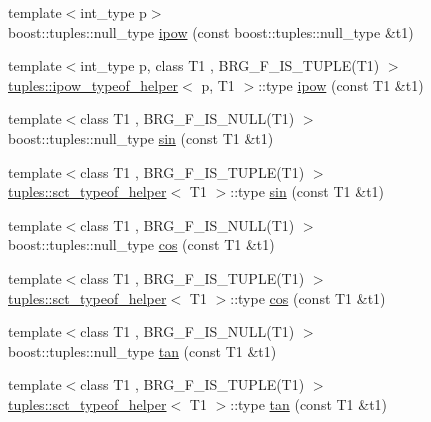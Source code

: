 \begin{DoxyCompactItemize}
\item 
{\footnotesize template$<$int\+\_\+type p$>$ }\\boost\+::tuples\+::null\+\_\+type \hyperlink{namespaceIceBRG_ae7f18ccc5167613b85197709db7a0622}{ipow} (const boost\+::tuples\+::null\+\_\+type \&t1)
\item 
{\footnotesize template$<$int\+\_\+type p, class T1 , B\+R\+G\+\_\+\+F\+\_\+\+I\+S\+\_\+\+T\+U\+P\+L\+E(\+T1) $>$ }\\\hyperlink{namespaceIceBRG_1_1tuples_structIceBRG_1_1tuples_1_1ipow__typeof__helper}{tuples\+::ipow\+\_\+typeof\+\_\+helper}$<$ p, T1 $>$\+::type \hyperlink{namespaceIceBRG_a32105d97f288cf7ddc6359c296ad616b}{ipow} (const T1 \&t1)
\item 
{\footnotesize template$<$class T1 , B\+R\+G\+\_\+\+F\+\_\+\+I\+S\+\_\+\+N\+U\+L\+L(\+T1) $>$ }\\boost\+::tuples\+::null\+\_\+type \hyperlink{namespaceIceBRG_a7d2b97ebbeb202a1ca4f445bda7390b3}{sin} (const T1 \&t1)
\item 
{\footnotesize template$<$class T1 , B\+R\+G\+\_\+\+F\+\_\+\+I\+S\+\_\+\+T\+U\+P\+L\+E(\+T1) $>$ }\\\hyperlink{namespaceIceBRG_1_1tuples_structIceBRG_1_1tuples_1_1sct__typeof__helper}{tuples\+::sct\+\_\+typeof\+\_\+helper}$<$ T1 $>$\+::type \hyperlink{namespaceIceBRG_a57632b44d01f63ff4a21726aee92500f}{sin} (const T1 \&t1)
\item 
{\footnotesize template$<$class T1 , B\+R\+G\+\_\+\+F\+\_\+\+I\+S\+\_\+\+N\+U\+L\+L(\+T1) $>$ }\\boost\+::tuples\+::null\+\_\+type \hyperlink{namespaceIceBRG_a0c9d048c22cc1bb0e0f593417819bab8}{cos} (const T1 \&t1)
\item 
{\footnotesize template$<$class T1 , B\+R\+G\+\_\+\+F\+\_\+\+I\+S\+\_\+\+T\+U\+P\+L\+E(\+T1) $>$ }\\\hyperlink{namespaceIceBRG_1_1tuples_structIceBRG_1_1tuples_1_1sct__typeof__helper}{tuples\+::sct\+\_\+typeof\+\_\+helper}$<$ T1 $>$\+::type \hyperlink{namespaceIceBRG_a025c97fe4f05e35a0c4ec0cbd8a7ef0d}{cos} (const T1 \&t1)
\item 
{\footnotesize template$<$class T1 , B\+R\+G\+\_\+\+F\+\_\+\+I\+S\+\_\+\+N\+U\+L\+L(\+T1) $>$ }\\boost\+::tuples\+::null\+\_\+type \hyperlink{namespaceIceBRG_ab50f9564c9e79be7b53b1d19f6cebab1}{tan} (const T1 \&t1)
\item 
{\footnotesize template$<$class T1 , B\+R\+G\+\_\+\+F\+\_\+\+I\+S\+\_\+\+T\+U\+P\+L\+E(\+T1) $>$ }\\\hyperlink{namespaceIceBRG_1_1tuples_structIceBRG_1_1tuples_1_1sct__typeof__helper}{tuples\+::sct\+\_\+typeof\+\_\+helper}$<$ T1 $>$\+::type \hyperlink{namespaceIceBRG_ac1c4e93a0efb030bb1bdfc95401d0c11}{tan} (const T1 \&t1)

\end{DoxyCompactItemize}

